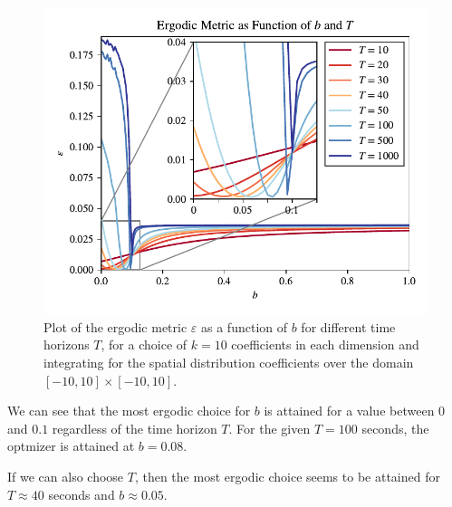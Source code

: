 \begin{figure}[h]
    \centering
    \includegraphics[]{ergodic_metric_final_colored.pdf}
    \vspace{-5mm}
    \caption{Plot of the ergodic metric $\varepsilon$ as a function of $b$ for different time horizons $T$, 
    for a choice of $k=10$ coefficients in each dimension and integrating for the spatial distribution coefficients over the domain $[-10,10]\times[-10,10]$.}
    \label{fig:ergodic}
\end{figure}
We can see that the most ergodic choice for $b$ is attained for a value between $0$ and $0.1$ regardless of the time horizon $T$. 
For the given $T=100$ seconds, the optmizer is attained at $b=0.08$.

If we can also choose $T$, then the most ergodic choice seems to be attained for $T\approx40$ seconds and $b\approx0.05$.